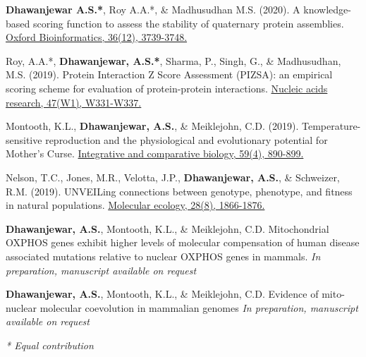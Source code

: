


\begin{cvpubs}

\vspace{-1mm}


  \pubentry
    {\textbf{Dhawanjewar A.S.*}, Roy A.A.*, \& Madhusudhan M.S. (2020).}
	{A knowledge-based scoring function to assess the stability of quaternary protein assemblies.}
	{\href{https://doi.org/10.1101/562520}{Oxford Bioinformatics, 36(12), 3739-3748.}} 
	
  \pubentry
     {Roy, A.A.*, \textbf{Dhawanjewar, A.S.*}, Sharma, P., Singh, G., \& Madhusudhan, M.S. (2019).}
  	{Protein Interaction Z Score Assessment (PIZSA): an empirical scoring scheme for evaluation of protein-protein interactions.} 
	{\href{https://doi.org/10.1093/nar/gkz368}{Nucleic acids research, 47(W1), W331-W337.}}

  \pubentry
    {Montooth, K.L., \textbf{Dhawanjewar, A.S.}, \& Meiklejohn, C.D. (2019).}
	{Temperature-sensitive reproduction and the physiological and evolutionary potential for Mother's Curse.}	{\href{https://doi.org/10.1093/icb/icz091}{Integrative and comparative biology, 59(4), 890-899.}}

  \pubentry
    {Nelson, T.C., Jones, M.R., Velotta, J.P., \textbf{Dhawanjewar, A.S.}, \& Schweizer, R.M. (2019).}
	{UNVEILing connections between genotype, phenotype, and fitness in natural populations.}
	{\href{https://doi.org/10.1111/mec.15067}{Molecular ecology, 28(8), 1866-1876.}}

  \pubentry
    {\textbf{Dhawanjewar, A.S.}, Montooth, K.L., \& Meiklejohn, C.D.}
	{Mitochondrial OXPHOS genes exhibit higher levels of molecular compensation of human disease associated mutations relative to nuclear OXPHOS genes in mammals.}
	{\textit{In preparation, manuscript available on request}}

  \pubentry
    {\textbf{Dhawanjewar, A.S.}, Montooth, K.L., \& Meiklejohn, C.D.}
  {Evidence of mito-nuclear molecular coevolution in mammalian genomes}
  {\textit{In preparation, manuscript available on request}}

	
	\fontsize{10pt}{1em}\bodyfontlight\itshape\color{graytext} * Equal contribution

\end{cvpubs}



 \\


